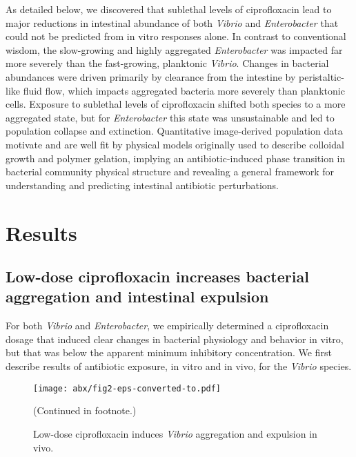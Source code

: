 As detailed below, we discovered that sublethal levels of ciprofloxacin lead to major reductions in intestinal abundance of both \textit{Vibrio} and \textit{Enterobacter} that could not be predicted from in vitro responses alone. In contrast to conventional wisdom, the slow-growing and highly aggregated \textit{Enterobacter} was impacted far more severely than the fast-growing, planktonic \textit{Vibrio}. Changes in bacterial abundances were driven primarily by clearance from the intestine by peristaltic-like fluid flow, which impacts aggregated bacteria more severely than planktonic cells. Exposure to sublethal levels of ciprofloxacin shifted both species to a more aggregated state, but for \textit{Enterobacter} this state was unsustainable and led to population collapse and extinction. Quantitative image-derived population data motivate and are well fit by physical models originally used to describe colloidal growth and polymer gelation, implying an antibiotic-induced phase transition in bacterial community physical structure and revealing a general framework for understanding and predicting intestinal antibiotic perturbations.









 \section{Results}

 \subsection{Low-dose ciprofloxacin increases bacterial aggregation and intestinal expulsion}

For both \textit{Vibrio} and \textit{Enterobacter}, we empirically determined a ciprofloxacin dosage that induced clear changes in bacterial physiology and behavior in vitro, but that was below the apparent minimum inhibitory concentration. We first describe results of antibiotic exposure, in vitro and in vivo, for the \textit{Vibrio} species. 



\begin{figure}%
	\centerline{
		\texttt{[image: abx/fig2-eps-converted-to.pdf]}}
		\caption{Low-dose ciprofloxacin induces \textit{Vibrio} aggregation and expulsion in vivo.}{(Continued in footnote.)}
		\label{fig:fig2}
\end{figure}


